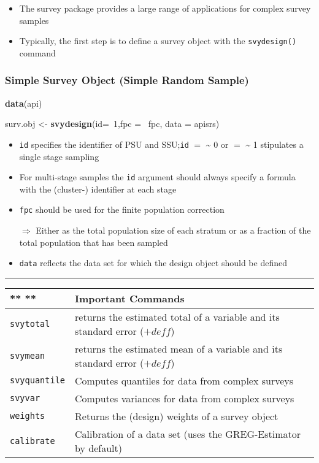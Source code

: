 \documentclass[]{article}
\newenvironment{Shaded}{\begin{snugshade}}{\end{snugshade}}
\newcommand{\KeywordTok}[1]{\textcolor[rgb]{0.13,0.29,0.53}{\textbf{{#1}}}}
\newcommand{\DataTypeTok}[1]{\textcolor[rgb]{0.13,0.29,0.53}{{#1}}}
\newcommand{\DecValTok}[1]{\textcolor[rgb]{0.00,0.00,0.81}{{#1}}}
\newcommand{\StringTok}[1]{\textcolor[rgb]{0.31,0.60,0.02}{{#1}}}
\newcommand{\NormalTok}[1]{{#1}}
\begin{document}
\begin{itemize}
\itemsep1pt\parskip0pt
\item
  The survey package provides a large range of applications for complex
  survey samples
\item
  Typically, the first step is to define a survey object with the
  \texttt{svydesign()} command
\end{itemize}

\subsubsection{Simple Survey Object (Simple Random
Sample)}\label{simple-survey-object-simple-random-sample}

\begin{Shaded}
\begin{Highlighting}[]
\KeywordTok{data}\NormalTok{(api)}

\NormalTok{surv.obj <-}\StringTok{ }\KeywordTok{svydesign}\NormalTok{(}\DataTypeTok{id=}\NormalTok{~}\DecValTok{1}\NormalTok{,}\DataTypeTok{fpc =} \NormalTok{~fpc, }\DataTypeTok{data =} \NormalTok{apisrs)}
\end{Highlighting}
\end{Shaded}

\begin{itemize}
\item
  \texttt{id} specifies the identifier of PSU and SSU;\texttt{id} \(=\)
  \textasciitilde{} 0 or \(=\) \textasciitilde{} 1 stipulates a single
  stage sampling
\item
  For multi-stage samples the \texttt{id} argument should always specify
  a formula with the (cluster-) identifier at each stage
\item
  \texttt{fpc} should be used for the finite population correction

  \(\Rightarrow\) Either as the total population size of each stratum or
  as a fraction of the total population that has been sampled\\
\item
  \texttt{data} reflects the data set for which the design object should
  be defined
\end{itemize}

\begin{center}\rule{0.5\linewidth}{\linethickness}\end{center}

\begin{longtable}[c]{@{}ll@{}}
\toprule
** ** & \textbf{Important Commands}\tabularnewline
\midrule
\endhead
\texttt{svytotal} & returns the estimated total of a variable and its
standard error (\(+ deff\))\tabularnewline
\texttt{svymean} & returns the estimated mean of a variable and its
standard error (\(+ deff\))\tabularnewline
\texttt{svyquantile} & Computes quantiles for data from complex
surveys\tabularnewline
\texttt{svyvar} & Computes variances for data from complex
surveys\tabularnewline
\texttt{weights} & Returns the (design) weights of a survey
object\tabularnewline
\texttt{calibrate} & Calibration of a data set (uses the GREG-Estimator
by default)\tabularnewline
\bottomrule
\end{longtable}
\end{document}
